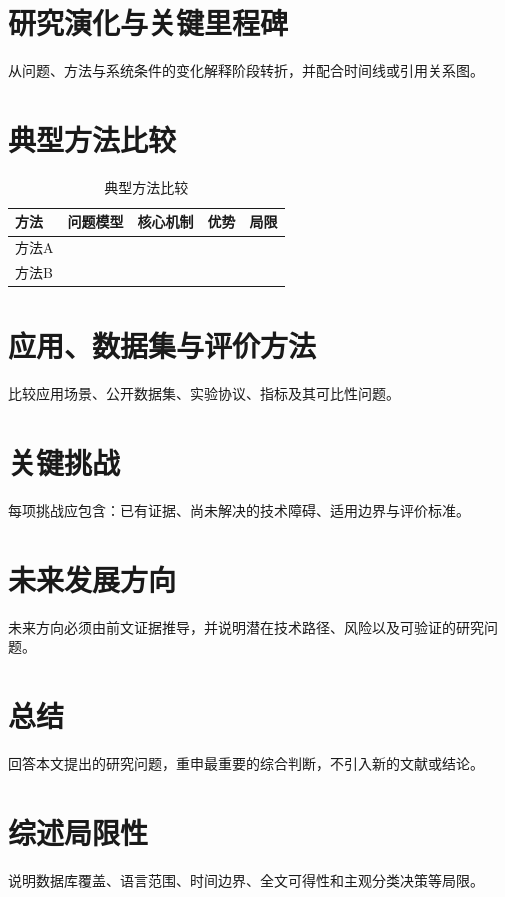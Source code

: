 \documentclass[UTF8,a4paper,10.5pt]{ctexart}
\begin{document}
\section{研究演化与关键里程碑}
从问题、方法与系统条件的变化解释阶段转折，并配合时间线或引用关系图。

\section{典型方法比较}

\begin{table}[htbp]
\centering
\caption{典型方法比较}
\begin{tabular}{lllll}
\toprule
方法 & 问题模型 & 核心机制 & 优势 & 局限 \\
\midrule
方法A &  &  &  &  \\
方法B &  &  &  &  \\
\bottomrule
\end{tabular}
\end{table}

\section{应用、数据集与评价方法}
比较应用场景、公开数据集、实验协议、指标及其可比性问题。

\section{关键挑战}
每项挑战应包含：已有证据、尚未解决的技术障碍、适用边界与评价标准。

\section{未来发展方向}
未来方向必须由前文证据推导，并说明潜在技术路径、风险以及可验证的研究问题。

\section{总结}
回答本文提出的研究问题，重申最重要的综合判断，不引入新的文献或结论。

\section*{综述局限性}
说明数据库覆盖、语言范围、时间边界、全文可得性和主观分类决策等局限。



\end{document}
